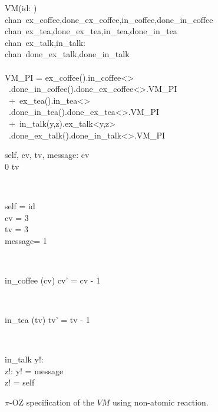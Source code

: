 \begin{figure}[H]
\centering
\begin{class}{VM(id: \integer)}
\ 
\\chan\ ex\_coffee,done\_ex\_coffee,in\_coffee,done\_in\_coffee
\ 
\\chan\ ex\_tea,done\_ex\_tea,in\_tea,done\_in\_tea
\ 
\\chan\ ex\_talk,in\_talk:\integer \times \integer
\ 
\\chan\ done\_ex\_talk,done\_in\_talk
\ \\ \
\\VM\_PI = ex\_coffee().in\_coffee<>
\\ \ \qquad \qquad \qquad .done\_in\_coffee().done\_ex\_coffee<>.VM\_PI 
\\ \ \qquad \qquad +\ ex\_tea().in\_tea<>
\\ \ \qquad \qquad \qquad .done\_in\_tea().done\_ex\_tea<>.VM\_PI 
\\ \ \qquad \qquad +\ in\_talk(y,z).ex\_talk<y,z>
\\ \ \qquad \qquad \qquad .done\_ex\_talk().done\_in\_talk<>.VM\_PI
\\
\begin{state}
self, cv, tv, message: \integer
\ST
0 \leq  cv 
\\
0 \leq  tv \leq 3
\end{state} 
\\
\begin{init}
self = id
\\cv = 3
\\tv = 3
\\ message= 1
\end{init} 
\\
\begin{op}{in\_coffee}
\Delta (cv)
\ST
cv' = cv - 1
\end{op}
\\
\begin{op}{in\_tea}
\Delta (tv)
\ST
tv' = tv - 1
\end{op}
\\
\begin{op}{in\_talk}
y!: \integer
\\z!: \integer
\ST
y! = message
\\z! = self
\end{op}
\end{class}
\caption{$\pi$-OZ specification of the $VM$ using non-atomic reaction.}
\label{comp_oz_pi_statefull_vm_non_atomic}
\end{figure}